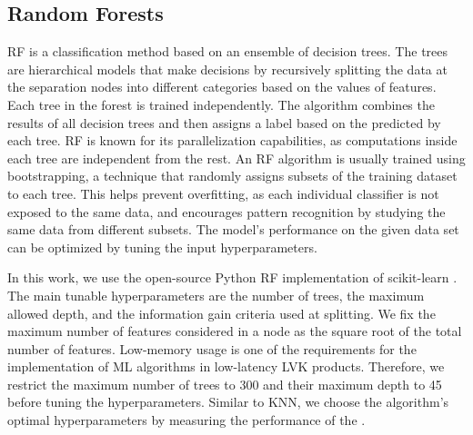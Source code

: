\subsection*{Random Forests}

\ac{RF} is a classification method based on an ensemble of decision trees. The trees are hierarchical models that make decisions by recursively splitting the data at the separation nodes into different categories based on the values of features. Each tree in the forest is trained independently. The algorithm combines the results of all decision trees and then assigns a label based on the  predicted by each tree. \ac{RF} is known for its parallelization capabilities, as computations inside each tree are independent from the rest. An \ac{RF} algorithm is usually trained using bootstrapping, a technique that randomly assigns subsets of the training dataset to each tree. This helps prevent overfitting, as each individual classifier is not exposed to the same data, and encourages pattern recognition by studying the same data from different subsets. The model's performance on the given data set can be optimized by tuning the input hyperparameters.

In this work, we use the open-source Python \ac{RF} implementation of scikit-learn \cite{Pedregosa:2011}. The main tunable hyperparameters are the number of trees, the maximum allowed depth, and the information gain criteria used at splitting. We fix the maximum number of features considered in a node as the square root of the total number of features. Low-memory usage is one of the requirements for the implementation of \ac{ML} algorithms in low-latency \ac{LVK} products. Therefore, we restrict the maximum number of trees to 300 and their maximum depth to 45 before tuning the hyperparameters. Similar to \ac{KNN}, we choose the algorithm's optimal hyperparameters by measuring the performance of the  .
